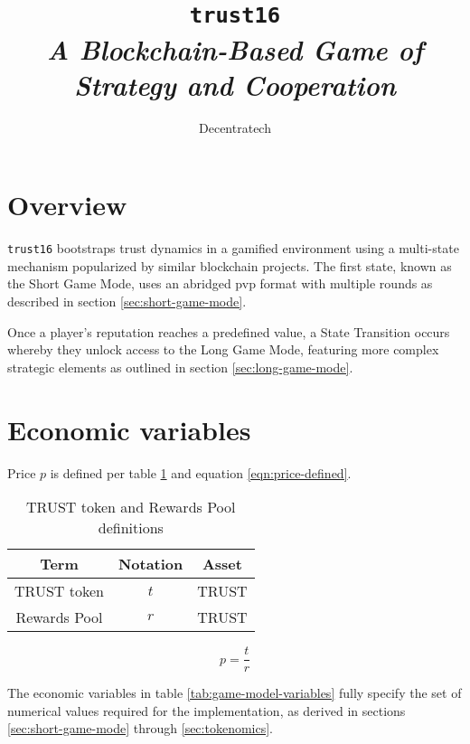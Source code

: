 \documentclass[table, twocolumn]{article}
\title{%
  \Huge \texttt{trust16} \\ \vspace{10pt}
  \small \emph{A Blockchain-Based Game of Strategy and Cooperation}
}
\author{Decentratech}
\date{}
\begin{document}
\maketitle

\section{Overview} \label{sec:overview}

\texttt{trust16} bootstraps trust dynamics in a gamified environment using a
multi-state mechanism popularized by similar blockchain projects. The first state,
known as the Short Game Mode, uses an abridged \gls{pvp} format with multiple rounds
as described in section \ref{sec:short-game-mode}.

Once a player's reputation reaches a predefined value, a State Transition occurs
whereby they unlock access to the Long Game Mode, featuring more complex strategic
elements as outlined in section \ref{sec:long-game-mode}.

\section{Economic variables}

Price $p$ is defined per table \ref{tab:t-r-definitions} and equation
\ref{eqn:price-defined}.

\begin{table}[!htb]
  \centering
  \begin{tabular}{|c|c|c|}
    \hline \rowcolor{gray!20}
    Term          & Notation & Asset        \\ \hline
    TRUST token   & $t$      & TRUST        \\ \hline
    Rewards Pool  & $r$      & TRUST        \\ \hline
  \end{tabular}
  \caption{TRUST token and Rewards Pool definitions}
  \label{tab:t-r-definitions}
\end{table}

\begin{equation} \label{eqn:price-defined}
  p = \frac{t}{r}
\end{equation}

The economic variables in table \ref{tab:game-model-variables} fully specify the set of
numerical values required for the implementation, as derived in sections
\ref{sec:short-game-mode} through \ref{sec:tokenomics}.
\end{document}
